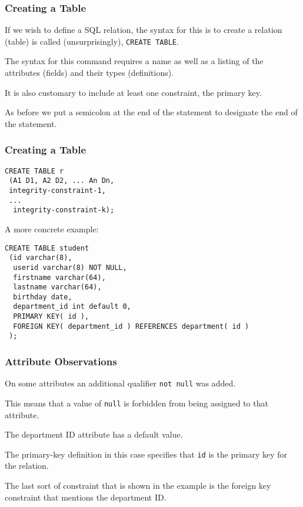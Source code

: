 \begin{frame}
\frametitle{Creating a Table}

If we wish to define a SQL relation, the syntax for this is to create a relation (table) is called (unsurprisingly), \texttt{CREATE TABLE}. 

The syntax for this command requires a name as well as a listing of the attributes (fields) and their types (definitions). 

It is also customary to include at least one constraint, the primary key. 

As before we put a semicolon at the end of the statement to designate the end of the statement. 

\end{frame}

\begin{frame}[fragile]
\frametitle{Creating a Table}


{\small
\begin{verbatim}
CREATE TABLE r
 (A1 D1, A2 D2, ... An Dn,
 integrity-constraint-1,
 ...
  integrity-constraint-k);
\end{verbatim}
}

A more concrete example: 
{\small
\begin{verbatim}
CREATE TABLE student
 (id varchar(8),
  userid varchar(8) NOT NULL,
  firstname varchar(64),
  lastname varchar(64),
  birthday date,
  department_id int default 0,
  PRIMARY KEY( id ),
  FOREIGN KEY( department_id ) REFERENCES department( id )
 );
\end{verbatim}
}

\end{frame}


\begin{frame}
\frametitle{Attribute Observations}

On some attributes an additional qualifier \texttt{not null} was added. 

This means that a value of \texttt{null} is forbidden from being assigned to that attribute. 

The department ID attribute has a default value.

The primary-key definition in this case specifies that \texttt{id} is the primary key for the relation.

The last sort of constraint that is shown in the example is the foreign key constraint that mentions the department ID.

\end{frame}

